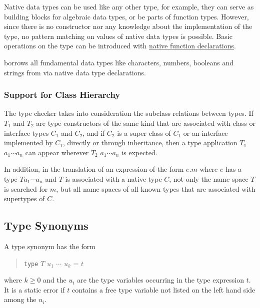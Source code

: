 Native data types can be used like any other type, for example, they can serve as building blocks for algebraic data types, or be parts of function types. However, since there is no constructor nor any knowledge about the implementation of the type, no pattern matching on values of native data types is possible. Basic operations on the type can be introduced with \hyperref[nativefun]{native function declarations}.

\frege{} borrows all fundamental data types like characters, numbers, booleans and strings from \java{} via native data type declarations. 

\subsubsection{Support for \java{} Class Hierarchy} \label{polymorphism}

The \frege{} type checker takes into consideration the subclass relations between \java{} types. If $T_1$ and $T_2$ are type constructors of the same kind that are associated with \java{} class or interface types $C_1$ and $C_2$, and if $C_2$ is a super class of $C_1$ or an interface implemented by $C_1$, directly or through inheritance, then a type application $T_1$ $a_1 \cdots{} a_n$ can appear wherever $T_2$ $a_1 \cdots{} a_n$ is expected.

In addition, in the translation of an expression of the form $e.m$ where $e$ has a type $T a_1 \cdots{} a_n$ and $T$ is associated with a native type $C$, not only the name space $T$ is searched for $m$, but all name spaces of all known types that are associated with supertypes of $C$.

\subsection{Type Synonyms} \label{typedcl} 

\begin{flushleft}
    \sym{=} 
\end{flushleft}

A type synonym has the form
\begin{quote}
\texttt{type} $T$ $u_1$ $\cdots$ $u_k$ = $t$
\end{quote}
where $k\ge 0$ and the $u_i$ are the type variables occurring in the type expression $t$. It is a static error if $t$ contains a free type variable not listed on the left hand side among the $u_i$. 

